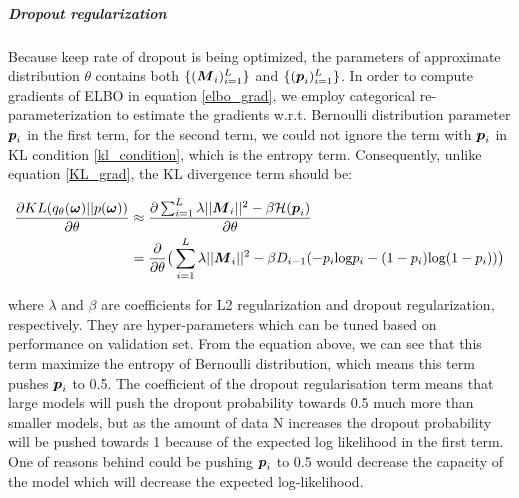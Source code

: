 \subparagraph{Dropout regularization}
Because keep rate of dropout is being optimized, the parameters of approximate distribution $\theta$ contains both $\{ (\boldsymbol M_i)_{i=1}^{L} \}$ and $\{(\boldsymbol p_i)_{i=1}^{L} \}$. In order to compute gradients of ELBO in equation \ref{elbo_grad}, we employ categorical re-parameterization to estimate the gradients w.r.t. Bernoulli distribution parameter $\boldsymbol p_i$ in the first term, for the second term, we could not ignore the term with $\boldsymbol p_i$ in KL condition \ref{kl_condition}, which is the entropy term. Consequently, unlike equation \ref{KL_grad}, the KL divergence term should be:

\begin{equation} 
\begin{aligned}\label{KL_grad_concrete}
\frac{\partial KL(q_{\theta}(\boldsymbol \omega)||p(\boldsymbol \omega))}{\partial \theta} 
&\approx \frac{\partial \sum_{i=1}^{L}\lambda||\boldsymbol M_{i}||^{2}- \beta\mathcal H(\boldsymbol p_{i})}{\partial \theta}  \\
&= \frac{\partial}{\partial \theta} \big( \sum_{i=1}^{L}\lambda||\boldsymbol M_{i}||^{2}- \beta D_{i-1}(-p_{i}\text{log}p_{i} - (1-p_{i})\text{log}(1-p_{i}))\big)
\end{aligned}
\end{equation}

where $\lambda$ and $\beta$ are coefficients for L2 regularization and dropout regularization, respectively. They are hyper-parameters which can be tuned based on performance on validation set.
From the equation above, we can see that this term maximize the entropy of Bernoulli distribution, which means this term pushes $\boldsymbol p_i$ to 0.5. The coefficient of the dropout regularisation term means that large models will push the dropout probability towards 0.5 much more than smaller models, but as the amount of data N increases the dropout probability will be pushed towards 1 because of the expected log likelihood in the first term. One of reasons behind could be pushing $\boldsymbol p_i$ to 0.5 would decrease the capacity of the model which will decrease the expected log-likelihood. 

